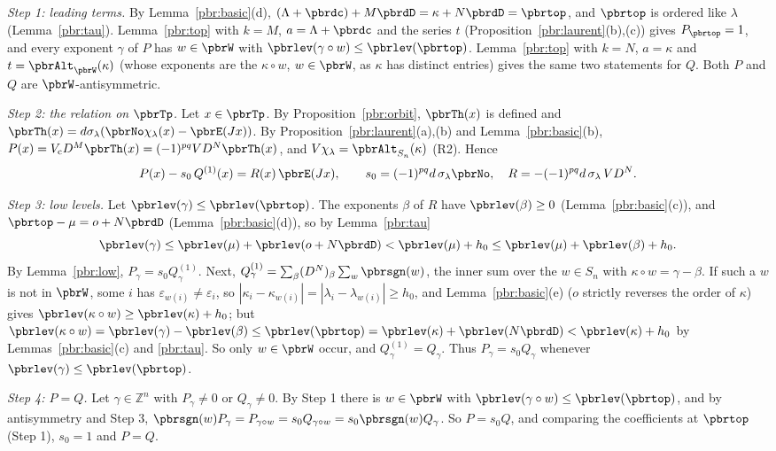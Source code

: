 \documentclass[10pt]{amsart}
\theoremstyle{definition}
\theoremstyle{remark}
\newcommand{\Z}{\mathbb Z}
\begin{document}
\emph{Step 1: leading terms.} By Lemma~\ref{pbr:basic}(d), $(\Lambda+\pbrdc)+M\pbrdD=\kappa+N\pbrdD=
\pbrtop$, and $\pbrtop$ is ordered like $\lambda$ (Lemma~\ref{pbr:tau}). Lemma~\ref{pbr:top} with
$k=M$, $a=\Lambda+\pbrdc$ and the series $t$ (Proposition~\ref{pbr:laurent}(b),(c)) gives $P_\pbrtop=1$,
and every exponent $\gamma$ of $P$ has $w\in\pbrW$ with $\pbrlev(\gamma\circ w)\le\pbrlev(\pbrtop)$.
Lemma~\ref{pbr:top} with $k=N$, $a=\kappa$ and $t=\pbrAlt_{\pbrW}(\kappa)$ (whose exponents are the
$\kappa\circ w$, $w\in\pbrW$, as $\kappa$ has distinct entries) gives the same two statements for
$Q$. Both $P$ and $Q$ are $\pbrW$-antisymmetric.

\emph{Step 2: the relation on $\pbrTp$.} Let $x\in\pbrTp$. By Proposition~\ref{pbr:orbit},
$\pbrTh(x)$ is defined and $\pbrTh(x)=d\sigma_\lambda(\pbrNo\chi_\lambda(x)-\pbrE(Jx))$. By
Proposition~\ref{pbr:laurent}(a),(b) and Lemma~\ref{pbr:basic}(b), $P(x)=V_{\mathrm c}D^M\pbrTh(x)=
(-1)^{pq}VD^N\pbrTh(x)$, and $V\chi_\lambda=\pbrAlt_{S_n}(\kappa)$ (R2). Hence
\[
P(x)-s_0\,Q^{(1)}(x)=R(x)\,\pbrE(Jx),\qquad s_0=(-1)^{pq}d\,\sigma_\lambda\pbrNo,\quad R=-(-1)^{pq}
d\,\sigma_\lambda\,VD^N .
\]

\emph{Step 3: low levels.} Let $\pbrlev(\gamma)\le\pbrlev(\pbrtop)$. The exponents $\beta$ of $R$ have
$\pbrlev(\beta)\ge0$ (Lemma~\ref{pbr:basic}(c)), and $\pbrtop-\mu=o+N\pbrdD$ (Lemma~\ref{pbr:basic}(d)),
so by Lemma~\ref{pbr:tau}
\[
\pbrlev(\gamma)\le\pbrlev(\mu)+\pbrlev(o+N\pbrdD)<\pbrlev(\mu)+h_0\le\pbrlev(\mu)+\pbrlev(\beta)+h_0 .
\]
By Lemma~\ref{pbr:low}, $P_\gamma=s_0Q^{(1)}_\gamma$. Next, $Q^{(1)}_\gamma=\sum_\beta(D^N)_\beta
\sum_w\pbrsgn(w)$, the inner sum over the $w\in S_n$ with $\kappa\circ w=\gamma-\beta$. If such a $w$
is not in $\pbrW$, some $i$ has $\varepsilon_{w(i)}\ne\varepsilon_i$, so $|\kappa_i-\kappa_{w(i)}|=
|\lambda_i-\lambda_{w(i)}|\ge h_0$, and Lemma~\ref{pbr:basic}(e) ($o$ strictly reverses the order of
$\kappa$) gives $\pbrlev(\kappa\circ w)\ge\pbrlev(\kappa)+h_0$; but $\pbrlev(\kappa\circ w)=\pbrlev
(\gamma)-\pbrlev(\beta)\le\pbrlev(\pbrtop)=\pbrlev(\kappa)+\pbrlev(N\pbrdD)<\pbrlev(\kappa)+h_0$ by
Lemmas~\ref{pbr:basic}(c) and \ref{pbr:tau}. So only $w\in\pbrW$ occur, and $Q^{(1)}_\gamma=Q_\gamma$.
Thus $P_\gamma=s_0Q_\gamma$ whenever $\pbrlev(\gamma)\le\pbrlev(\pbrtop)$.

\emph{Step 4: $P=Q$.} Let $\gamma\in\Z^n$ with $P_\gamma\ne0$ or $Q_\gamma\ne0$. By Step 1 there is
$w\in\pbrW$ with $\pbrlev(\gamma\circ w)\le\pbrlev(\pbrtop)$, and by antisymmetry and Step 3,
$\pbrsgn(w)P_\gamma=P_{\gamma\circ w}=s_0Q_{\gamma\circ w}=s_0\pbrsgn(w)Q_\gamma$. So $P=s_0Q$, and
comparing the coefficients at $\pbrtop$ (Step 1), $s_0=1$ and $P=Q$.
\end{document}
